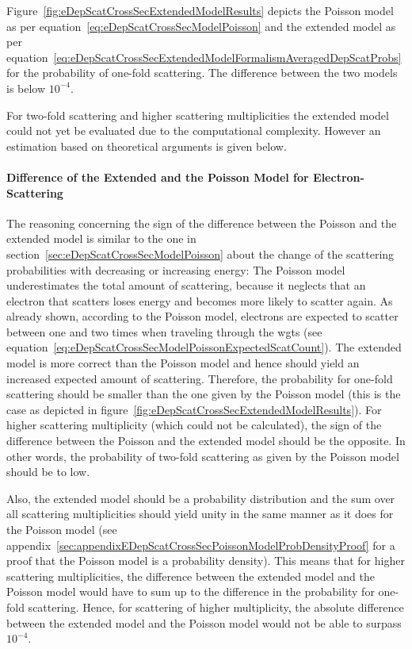Figure~\ref{fig:eDepScatCrossSecExtendedModelResults} depicts the Poisson model as per equation~\eqref{eq:eDepScatCrossSecModelPoisson} and the extended model as per equation~\eqref{eq:eDepScatCrossSecExtendedModelFormalismAveragedDepScatProbs} for the probability of one-fold scattering. The difference between the two models is below $10^{-4}$.

For two-fold scattering and higher scattering multiplicities the extended model could not yet be evaluated due to the computational complexity. However an estimation based on theoretical arguments is given below.

\paragraph{Difference of the Extended and the Poisson Model for Electron-Scattering}
The reasoning concerning the sign of the difference between the Poisson and the extended model is similar to the one in section~\ref{sec:eDepScatCrossSecModelPoisson} about the change of the scattering probabilities with decreasing or increasing energy: The Poisson model underestimates the total amount of scattering, because it neglects that an electron that scatters loses energy and becomes more likely to scatter again. As already shown, according to the Poisson model, electrons are expected to scatter between one and two times when traveling through the \gls{wgts} (see equation~\ref{eq:eDepScatCrossSecModelPoissonExpectedScatCount}). The extended model is more correct than the Poisson model and hence should yield an increased expected amount of scattering. Therefore, the probability for one-fold scattering should be smaller than the one given by the Poisson model (this is the case as depicted in figure~\ref{fig:eDepScatCrossSecExtendedModelResults}). For higher scattering multiplicity (which could not be calculated), the sign of the difference between the Poisson and the extended model should be the opposite. In other words, the probability of two-fold scattering as given by the Poisson model should be to low.

Also, the extended model should be a probability distribution and the sum over all scattering multiplicities should yield unity in the same manner as it does for the Poisson model (see appendix~\ref{sec:appendixEDepScatCrossSecPoissonModelProbDensityProof} for a proof that the Poisson model is a probability density). This means that for higher scattering multiplicities, the difference between the extended model and the Poisson model would have to sum up to the difference in the probability for one-fold scattering. Hence, for scattering of higher multiplicity, the absolute difference between the extended model and the Poisson model would not be able to surpass $10^{-4}$.

